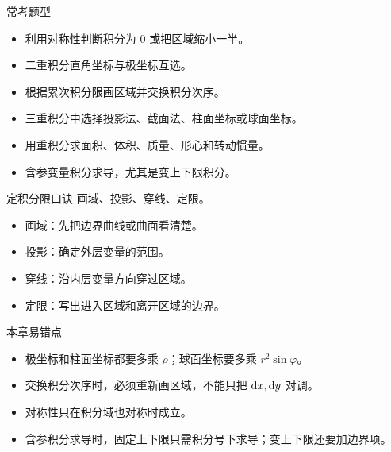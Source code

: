 \begin{methodbox}{常考题型}
\begin{itemize}
  \item 利用对称性判断积分为 $0$ 或把区域缩小一半。
  \item 二重积分直角坐标与极坐标互选。
  \item 根据累次积分限画区域并交换积分次序。
  \item 三重积分中选择投影法、截面法、柱面坐标或球面坐标。
  \item 用重积分求面积、体积、质量、形心和转动惯量。
  \item 含参变量积分求导，尤其是变上下限积分。
\end{itemize}
\end{methodbox}

\begin{summarybox}{定积分限口诀}
画域、投影、穿线、定限。
\begin{itemize}
  \item 画域：先把边界曲线或曲面看清楚。
  \item 投影：确定外层变量的范围。
  \item 穿线：沿内层变量方向穿过区域。
  \item 定限：写出进入区域和离开区域的边界。
\end{itemize}
\end{summarybox}

\begin{warningbox}{本章易错点}
\begin{itemize}
  \item 极坐标和柱面坐标都要多乘 $\rho$；球面坐标要多乘 $r^2\sin\varphi$。
  \item 交换积分次序时，必须重新画区域，不能只把 $\mathop{}\!\mathrm{d} x,\mathop{}\!\mathrm{d} y$ 对调。
  \item 对称性只在积分域也对称时成立。
  \item 含参积分求导时，固定上下限只需积分号下求导；变上下限还要加边界项。
\end{itemize}
\end{warningbox}
